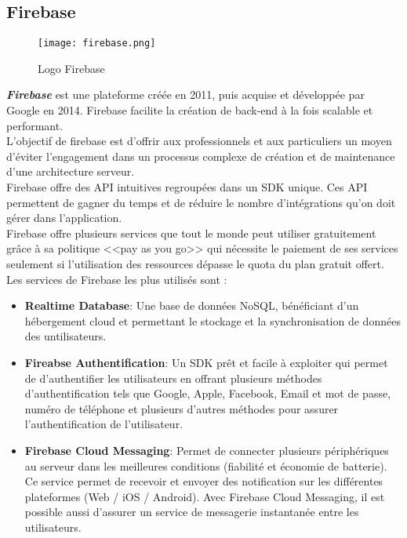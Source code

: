 \subsection{Firebase}
\vspace{1cm}
\begin{figure}[H]
    \centering
    \texttt{[image: firebase.png]}
    \vspace{.5cm}
    \caption{Logo Firebase}
    \label{fig:firebase_logo}
\end{figure}
\textit{\textbf{Firebase}} est une plateforme créée en 2011, puis acquise et développée par Google en 2014. Firebase facilite la création de back-end à la fois scalable et performant.\\
\noindent L'objectif de firebase est d'offrir aux professionnels et aux particuliers un moyen d'éviter l'engagement dans un processus complexe de création et de maintenance d'une architecture serveur.\\
\noindent Firebase offre des API intuitives regroupées dans un SDK unique. Ces API permettent de gagner du temps et de réduire le nombre d'intégrations qu'on doit gérer dans l'application.\\
\noindent Firebase offre plusieurs services que tout le monde peut utiliser gratuitement grâce à sa politique <<pay as you go>> qui nécessite le paiement de ses services seulement si l'utilisation des ressources dépasse le quota du plan gratuit offert. Les services de Firebase les plus utilisés sont :
\begin{itemize}
    \item \textbf{Realtime Database}: Une base de données NoSQL, bénéficiant d'un hébergement cloud et permettant le stockage et la synchronisation de données des untilisateurs.
    \item \textbf{Fireabse Authentification}: Un SDK prêt et facile à exploiter qui permet de d'authentifier les utilisateurs en offrant plusieurs méthodes d'authentification tels que Google, Apple, Facebook, Email et mot de passe, numéro de téléphone et plusieurs d'autres méthodes pour assurer l'authentification de l'utilisateur.
    \item \textbf{Firebase Cloud Messaging}: Permet de connecter plusieurs périphériques au serveur dans les meilleures conditions (fiabilité et économie de batterie). Ce service permet de recevoir et envoyer des notification sur les différentes plateformes (Web / iOS / Android). Avec Firebase Cloud Messaging, il est possible aussi d'assurer un service de messagerie instantanée entre les utilisateurs.
\end{itemize}
